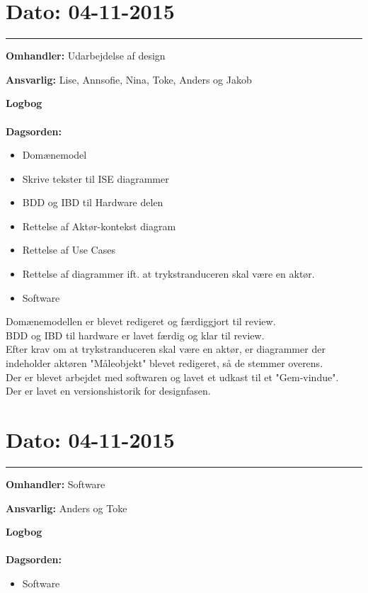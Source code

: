 \section{Dato: 04-11-2015 }
\hrule

\textbf{Omhandler:} Udarbejdelse af design  

\textbf{Ansvarlig:} Lise, Annsofie, Nina, Toke, Anders og Jakob

\textbf{Logbog}
\\
\\
\textbf{Dagsorden:}
\begin{itemize}
	\item Domænemodel
	\item Skrive tekster til ISE diagrammer
	\item BDD og IBD til Hardware delen
	\item Rettelse af Aktør-kontekst diagram
	\item Rettelse af Use Cases
	\item Rettelse af diagrammer ift. at trykstranduceren skal være en aktør.
	\item Software
\end{itemize}

Domænemodellen er blevet redigeret og færdiggjort til review.\\
BDD og IBD til hardware er lavet færdig og klar til review.\\
Efter krav om at trykstranduceren skal være en aktør, er diagrammer der indeholder aktøren "Måleobjekt" blevet redigeret, så de stemmer overens.\\
Der er blevet arbejdet med softwaren og lavet et udkast til et "Gem-vindue".\\
Der er lavet en versionshistorik for designfasen.




\section{Dato: 04-11-2015 }
\hrule

\textbf{Omhandler:} Software

\textbf{Ansvarlig:} Anders og Toke

\textbf{Logbog}
\\
\\
\textbf{Dagsorden:}
\begin{itemize}
	\item Software
\end{itemize}

